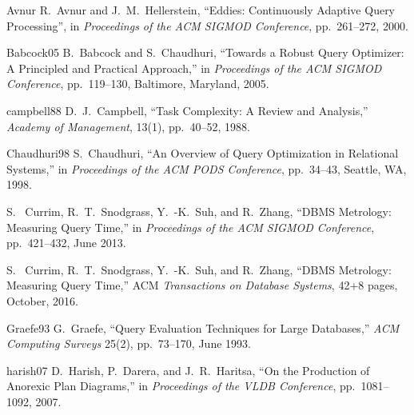 \documentclass[prodmode,acmtods]{acmsmall}
\begin{document}
%


\newcommand{\etalchar}[1]{$^{#1}$}
\begin{thebibliography}{99}

\vspace{0.1em}
\bibitem
{Avnur}
R.~Avnur and J.~M.~Hellerstein, ``Eddies: Continuously Adaptive Query
Processing'', in {\em Proceedings of the ACM SIGMOD Conference},
pp.~261--272, 2000.

\bibitem
{Babcock05}
B.~Babcock and S.~Chaudhuri, ``Towards a Robust Query Optimizer: A
Principled and Practical Approach,'' in {\em Proceedings of the ACM SIGMOD
  Conference}, pp.~119--130, Baltimore, Maryland, 2005.

\bibitem
{campbell88}
D.~J.~Campbell, ``Task Complexity: A Review and Analysis,'' {\em Academy of Management}, 13(1), pp.~40--52, 1988. 

\bibitem
{Chaudhuri98}
S.~Chaudhuri, ``An Overview of Query Optimization in Relational Systems,'' in {\em Proceedings of the ACM PODS Conference}, pp.~34--43, Seattle, WA, 1998.


S.~ Currim, R.~T.~Snodgrass, Y.~-K.~Suh, and R.~Zhang,
``DBMS Metrology: Measuring Query Time,'' in {\em Proceedings of the ACM
  SIGMOD Conference}, pp.~421--432, June 2013.

S.~ Currim, R.~T.~Snodgrass, Y.~-K.~Suh, and R.~Zhang,
``DBMS Metrology: Measuring Query Time,'' ACM {\em Transactions
on Database Systems}, 42+8 pages, October, 2016.

\bibitem
{Graefe93}
G.~Graefe, ``Query Evaluation Techniques for Large Databases,'' {\em ACM
  Computing Surveys} 25(2), pp.~73--170, June 1993.

\bibitem
{harish07}
D.~Harish, P.~Darera, and J.~R.~Haritsa, ``On the Production of Anorexic
Plan Diagrams,'' in {\em Proceedings of the VLDB Conference},
pp.~1081--1092, 2007.


\end{thebibliography}
\end{document}
